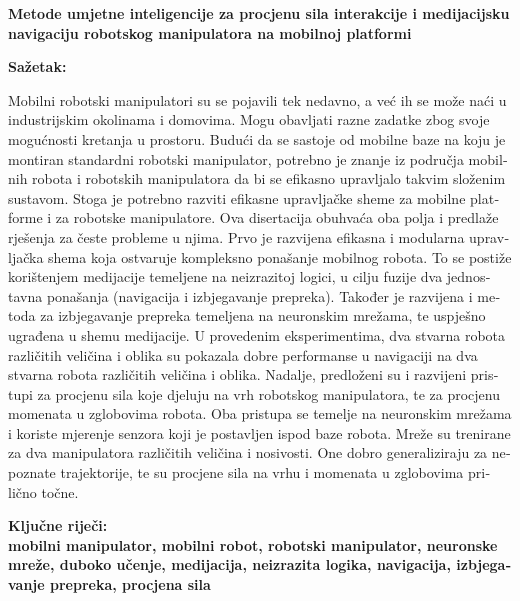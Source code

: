 

\newpage
\setlength{\parindent}{0in}
{\fontsize{14}{18}\bf {Metode umjetne inteligencije za procjenu sila interakcije i medijacijsku navigaciju robotskog manipulatora na mobilnoj platformi}}

\vskip 15mm
\begin{otherlanguage}{croatian}
\textbf{Sa\v{z}etak:\\}
   
\textnormal{Mobilni robotski manipulatori su se pojavili tek nedavno, a već ih se može naći u industrijskim okolinama i domovima. Mogu obavljati razne zadatke zbog svoje mogućnosti kretanja u prostoru. Budući da se sastoje od mobilne baze na koju je montiran standardni robotski manipulator, potrebno je znanje iz područja mobilnih robota i robotskih manipulatora da bi se efikasno upravljalo takvim složenim sustavom. Stoga je potrebno razviti efikasne upravljačke sheme za mobilne platforme i za robotske manipulatore. Ova disertacija obuhvaća oba polja i predlaže rješenja za česte probleme u njima. Prvo je razvijena efikasna i modularna upravljačka shema koja ostvaruje kompleksno ponašanje mobilnog robota. To se postiže korištenjem medijacije temeljene na neizrazitoj logici, u cilju fuzije dva jednostavna ponašanja (navigacija i izbjegavanje prepreka). Također je razvijena i metoda za izbjegavanje prepreka temeljena na neuronskim mrežama, te uspješno ugrađena u shemu medijacije. U provedenim eksperimentima, dva stvarna robota različitih veličina i oblika su pokazala dobre performanse u navigaciji na dva stvarna robota različitih veličina i oblika. Nadalje, predloženi su i razvijeni pristupi za procjenu sila koje djeluju na vrh robotskog manipulatora, te za procjenu momenata u zglobovima robota. Oba pristupa se temelje na neuronskim mrežama i koriste mjerenje senzora koji je postavljen ispod baze robota. Mreže su trenirane za dva manipulatora različitih veličina i nosivosti. One dobro generaliziraju za nepoznate trajektorije, te su procjene sila na vrhu i momenata u zglobovima prilično točne.}

\vskip 15mm
\bf{Klju\v{c}ne rije\v{c}i:\\}
\textnormal{mobilni manipulator, mobilni robot, robotski manipulator, neuronske mreže, duboko učenje, medijacija, neizrazita logika, navigacija, izbjegavanje prepreka, procjena sila}
\end{otherlanguage}